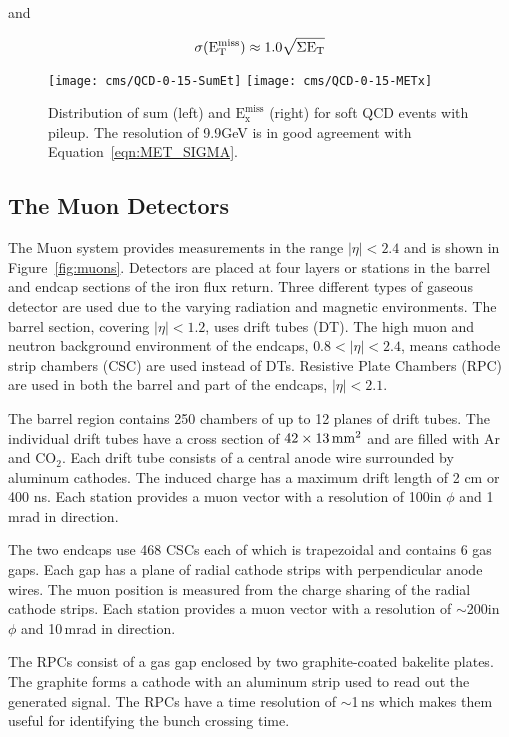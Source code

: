 and

\begin{equation}
 \sigma(\mathrm{E_{T}^{miss}})\approx 1.0 \sqrt{ \Sigma \mathrm{E_{\mathrm{T}}}}
 \label{eqn:MET_SIGMA}
\end{equation}

\begin{figure}[bt]
  \centering
  \texttt{[image: cms/QCD-0-15-SumEt]}
  \texttt{[image: cms/QCD-0-15-METx]}
  \caption{Distribution of sum \ET (left) and $\mathrm{E_{x}^{miss}}$ (right) for soft QCD events with pileup. The \MET resolution of 9.9GeV is in good agreement with Equation~\ref{eqn:MET_SIGMA}.~\cite{CMS_TDR_PHYS_vol1}
  \label{fig:MET_perf}}
\end{figure}

\subsection{The Muon Detectors}
The Muon system provides measurements in the range $|\eta| < 2.4$ and is shown in Figure~\ref{fig:muons}. Detectors are placed at four layers or stations in the barrel and endcap sections of the iron flux return. Three different types of gaseous detector are used due to the varying radiation and magnetic environments. The barrel section, covering $|\eta| < 1.2$, uses drift tubes (DT). The high muon and neutron background environment of the endcaps, $0.8 < |\eta| < 2.4$, means cathode strip chambers (CSC) are used instead of DTs. Resistive Plate Chambers (RPC) are used in both the barrel and part of the endcaps, $|\eta| < 2.1$.

The barrel region contains 250 chambers of up to 12 planes of drift tubes. The individual drift tubes have a cross section of $42 \times 13\,\mathrm{mm^{\mathrm{2}}}$ and are filled with Ar and $\mathrm{CO_{2}}$. Each drift tube consists of a central anode wire surrounded by aluminum cathodes. The induced charge has a maximum drift length of 2 cm or 400 ns. Each station provides a muon vector with a resolution of 100\micron in $\phi$ and 1 mrad in direction.

The two endcaps use 468 CSCs each of which is trapezoidal and contains 6 gas gaps. Each gap has a plane of radial cathode strips with perpendicular anode wires. The muon position is measured from the charge sharing of the radial cathode strips. Each station provides a muon vector with a resolution of $\sim$200\micron in $\phi$ and 10\,mrad in direction. 

The RPCs consist of a gas gap enclosed by two graphite-coated bakelite plates. The graphite forms a cathode with an aluminum strip used to read out the generated signal. The RPCs have a time resolution of $\sim$1\,ns which makes them useful for identifying the bunch crossing time. 


